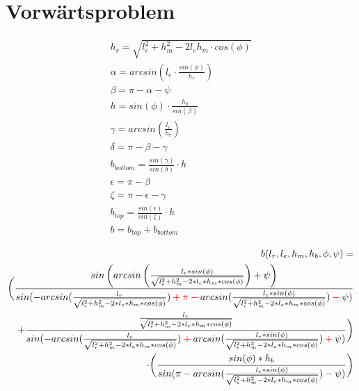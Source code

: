 \documentclass[12pt,a4paper]{article}
\author{Vera Loeser}
\begin{document}
	\section{Vorw\"artsproblem}

\begin{align*}
h_r = \sqrt{l_e^2 + h_m^2 - 2l_eh_m\cdot cos(\phi)}\\
\alpha =arcsin\left(l_e \cdot \frac{sin(\phi)}{h_r}\right)\\
\beta = \pi - \alpha - \psi\\
h = sin(\phi) \cdot \frac{h_b}{sin(\beta)}\\
\gamma = arcsin(\frac{l_r}{h_r})\\
\delta = \pi - \beta - \gamma\\
b_{bottom} = \frac{sin(\gamma)}{sin(\delta)}\cdot h\\
\epsilon = \pi - \beta\\
\zeta = \pi - \epsilon - \gamma\\
b_{top} = \frac{sin(\epsilon)}{sin(\zeta)}\cdot h\\
b = b_{top} + b_{bottom}
\end{align*}

\begin{align*}
\begin{split}
b (l_r, l_e, h_m, h_b, \phi, \psi) =\\ \bigg(\frac{sin\left(arcsin\left(\frac{l_e*sin(\phi)}{\sqrt{l_e ^2 + h_m^2 - 2*l_e*h_m * cos(\phi)}}\right)+\psi\right) }{sin(-arcsin(\frac{l_r}{\sqrt{l_e ^2 + h_m^2 - 2*l_e*h_m * cos(\phi)}})\color{red} + \pi - \color{black} arcsin(\frac{l_e * sin(\phi)}{\sqrt{l_e ^2 + h_m^2 - 2*l_e*h_m * cos(\phi)}}) \color{red} - \color{black} \psi)}\\ 
+ \frac{\frac{l_r}{\sqrt{l_e ^2 + h_m^2 - 2*l_e*h_m * cos(\phi)}}}{sin(-arcsin(\frac{l_r}{\sqrt{l_e ^2 + h_m^2 - 2*l_e*h_m * cos(\phi)}}) \color{red}+\color{black} arcsin(\frac{l_e * sin(\phi)}{\sqrt{l_e ^2 + h_m^2 - 2*l_e*h_m * cos(\phi)}}) \color{red} + \color{black} \psi)}\bigg)\\
\cdot\bigg(\frac{sin(\phi) * h_b}{sin(\pi - arcsin(\frac{l_e * sin(\phi)}{\sqrt{l_e ^2 + h_m^2 - 2*l_e*h_m * cos(\phi)}}) - \psi)}\bigg)
\end{split}
\end{align*}
\end{document}
